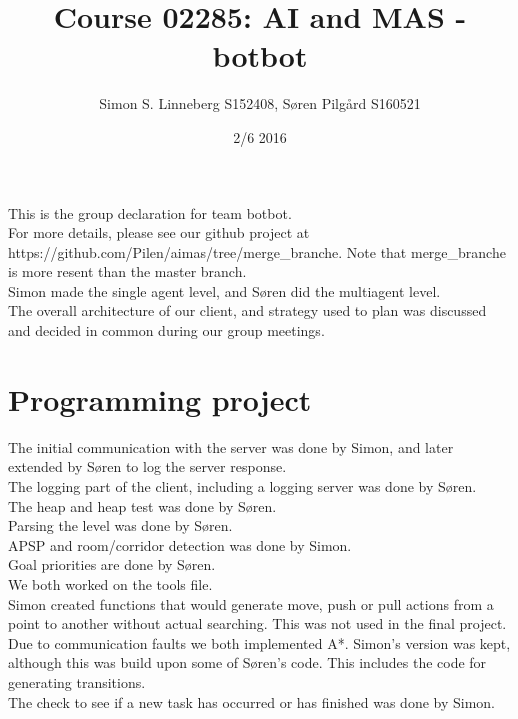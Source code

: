 \documentclass{article}
\title{Course 02285: AI and MAS - botbot}
\author{Simon S. Linneberg S152408, Søren Pilgård S160521}
\date{2/6 2016}
\begin{document}
\maketitle
This is the group declaration for team botbot.\\

For more details, please see our github project at https://github.com/Pilen/aimas/tree/merge\_branche.
Note that merge\_branche is more resent than the master branch.\\

Simon made the single agent level, and Søren did the multiagent level.\\

The overall architecture of our client, and strategy used to plan was discussed
and decided in common during our group meetings.\\

\section{Programming project}
The initial communication with the server was done by Simon, and later extended
by Søren to log the server response.\\

The logging part of the client, including a logging server was done by Søren.\\

The heap and heap test was done by Søren.\\

Parsing the level was done by Søren. \\

APSP and room/corridor detection was done by Simon.\\

Goal priorities are done by Søren.\\

We both worked on the tools file.\\

Simon created functions that would generate move, push or pull actions from a point
to another without actual searching. This was not used in the final project.\\

Due to communication faults we both implemented A*. Simon's version was kept, although
this was build upon some of Søren's code. This includes the code for generating
transitions.\\

The check to see if a new task has occurred or has finished was done by Simon.\\
\end{document}
